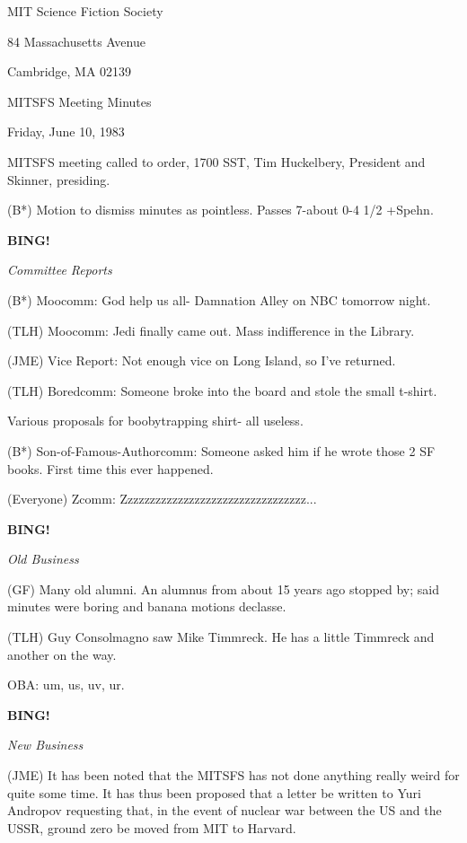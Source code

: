 \documentclass[12pt]{article}
\newcommand{\bing}{{\bf BING!} }
\newcommand{\goto}[1]{\bing \vskip 12pt \centerline{{\em{#1}}}}
\begin{document}
\begin{center}

MIT Science Fiction Society 

84 Massachusetts Avenue

Cambridge, MA 02139

\vspace{12pt}

MITSFS Meeting Minutes 

Friday, June 10, 1983

\end{center}
 
\vspace{18pt}

\setlength{\parskip}{6pt}

\noindent
MITSFS meeting called to order, 1700 SST,
Tim Huckelbery, President and Skinner, presiding.

(B*) Motion to dismiss minutes as pointless. Passes 7-about 0-4 1/2 +Spehn.

\goto{Committee Reports}

(B*) Moocomm: God help us all- Damnation Alley on NBC tomorrow night.

(TLH) Moocomm: Jedi finally came out. Mass indifference in the Library.

(JME) Vice Report: Not enough vice on Long Island, so I've returned.

(TLH) Boredcomm: Someone broke into the board and stole the small t-shirt.

Various proposals for boobytrapping shirt- all useless.

(B*) Son-of-Famous-Authorcomm: Someone asked him if he wrote those 2 SF books. First time this ever happened.

(Everyone) Zcomm: Zzzzzzzzzzzzzzzzzzzzzzzzzzzzzzzzz...

\goto{Old Business}

(GF) Many old alumni. An alumnus from about 15 years ago stopped by; said minutes were boring and banana motions declasse.

(TLH) Guy Consolmagno saw Mike Timmreck. He has a little Timmreck and another on the way.

OBA: um, us, uv, ur.

\goto{New Business}

(JME) It has been noted that the MITSFS has not done anything really weird for quite some time. It has thus been proposed that a letter be written to Yuri Andropov requesting that, in the event of nuclear war between the US and the USSR, ground zero be moved from MIT to Harvard.
\end{document}
